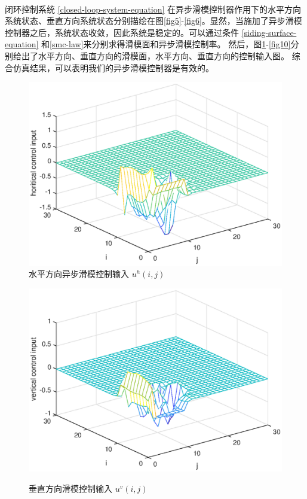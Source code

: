	\\闭环控制系统 \eqref{closed-loop-system-equation} 在异步滑模控制器作用下的水平方向系统状态、垂直方向系统状态分别描绘在图\ref{fig5}-\ref{fig6}。显然，当施加了异步滑模控制器之后，系统状态收敛，因此系统是稳定的。可以通过条件 \eqref{siding-surface-equation} 和\eqref{smc-law}来分别求得滑模面和异步滑模控制率。 然后，图\ref{fig7}-\ref{fig10}分别给出了水平方向、垂直方向的滑模面，水平方向、垂直方向的控制输入图。 综合仿真结果，可以表明我们的异步滑模控制器是有效的。
	\begin{figure}[!htb]
		\centering\includegraphics[scale=0.6]{./figures/2dsmc/simulations/h-control-input_eps.eps}
		\caption{水平方向异步滑模控制输入 $u^{h}(i,j)$}
		\label{fig7}
	\end{figure}
	\begin{figure}[!htb]
		\centering\includegraphics[scale=0.6]{./figures/2dsmc/simulations/v-controll-input_eps.eps}\\ 
		\caption{垂直方向滑模控制输入 $u^{v}(i,j)$}
		\label{fig8}
	\end{figure}
	
